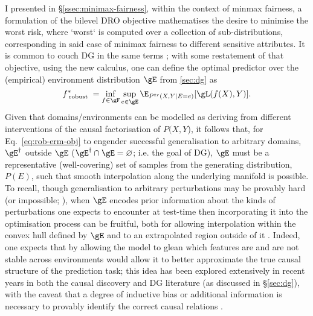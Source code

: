 I presented in \S\ref{ssec:minimax-fairness}, within the context of minmax fairness, a formulation
of the bilevel \ac{DRO} objective mathematises the desire to minimise the worst risk, where `worst`
is computed over a collection of sub-distributions, corresponding in said case of minimax fairness
to different sensitive attributes.
%
It is common to couch \ac{DG} in the same terms \citep{arjovsky2019invariant, krueger2021out,
sagawa2019distributionally}; with some restatement of that objective, using the new calculus, one
can define the optimal predictor over the (empirical) environment distribution \(\gE\) from
\ref{sec:dg} as
%
\begin{equation}\label{eq:rob-erm-obj} 
    f^\ast_\text{ robust } =
    \underset{ f \in \gF }{ \mathrm{inf} }\, 
    \underset{ e \in \gE}{ \mathrm{sup} }\,
    \E_{ P^{tr}( X, Y | E = e ) } [ \gL ( f( X ), Y ) ]. 
\end{equation}
%
Given that domains/environments can be modelled as deriving from different interventions of the
causal factorisation of \(P(X, Y\)), it follows that, for Eq.~\ref{eq:rob-erm-obj} to engender
successful generalisation to arbitrary domains, \(\gE^\dagger\) outside \(\gE\) (\( \gE^\dagger
\cap \gE = \varnothing \); i.e. the goal of \ac{DG}), \(\gE\) must be a representative
(well-covering) set of samples from the generating distribution, \( P(E) \), such that smooth
interpolation along the underlying manifold is possible.
%
%
To recall, though generalisation to arbitrary perturbations may be provably hard (or impossible;
\citealp{david2010impossibility}), when \(\gE\) encodes prior information about the kinds of
perturbations one expects to encounter at test-time then incorporating it into the optimisation
process can be fruitful, both for allowing interpolation within the convex hull defined by \(\gE\)
and to an extrapolated region outside of it \citep{krueger2021out}.
%
Indeed, one expects that by allowing the model to glean which features are and are not stable
across environments would allow it to better approximate the true causal structure of the
prediction task;
%
this idea has been explored extensively in recent years in both the causal discovery
\citep{peters2016causal, bengio2019meta} and \ac{DG} \citep{arjovsky2019invariant,
ahuja2020invariant, creager2021environment} literature (as discussed in \S\ref{sec:dg}), with the
caveat that a degree of inductive bias or additional information is necessary to provably identify
the correct causal relations \citep{lin2022zin}.
%

